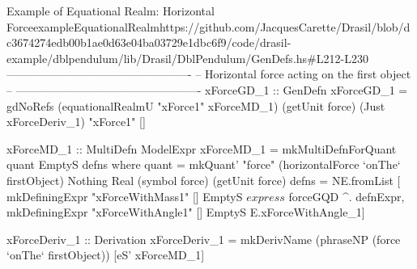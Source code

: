 \begin{haskell}{Example of Equational Realm: Horizontal Force}{exampleEquationalRealm}{https://github.com/JacquesCarette/Drasil/blob/dc3674274edb00b1ae0d63e04ba03729e1dbc6f9/code/drasil-example/dblpendulum/lib/Drasil/DblPendulum/GenDefs.hs\#L212-L230}
-------------------------------------------------
-- Horizontal force acting on the first object --
-------------------------------------------------
xForceGD_1 :: GenDefn
xForceGD_1 = gdNoRefs (equationalRealmU "xForce1" xForceMD_1)
        (getUnit force) (Just xForceDeriv_1) "xForce1" []

xForceMD_1 :: MultiDefn ModelExpr
xForceMD_1 = mkMultiDefnForQuant quant EmptyS defns
    where quant = mkQuant' "force" (horizontalForce `onThe` firstObject)
                    Nothing Real (symbol force) (getUnit force)
          defns = NE.fromList [
                    mkDefiningExpr "xForceWithMass1"
                      [] EmptyS $ express $ forceGQD ^. defnExpr,
                    mkDefiningExpr "xForceWithAngle1"
                      [] EmptyS E.xForceWithAngle_1]

xForceDeriv_1 :: Derivation
xForceDeriv_1 = mkDerivName (phraseNP (force `onThe` firstObject)) [eS' xForceMD_1]
\end{haskell}
